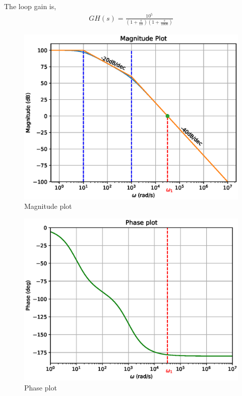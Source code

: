 \begin{enumerate}[label=\arabic*.,ref=\theenumi]
The loop gain is, 
\begin{align}
    GH(s) = \frac{10^5}{(1+\frac{s}{10})(1 + \frac{s}{1000})}
\end{align}

\begin{figure}[!ht]
    \centering
    \includegraphics[width=\columnwidth]{./figs/ee18btech11028/fig_1.eps}
    \caption{Magnitude plot}
    \label{fig:ee18btech11028_2_1}
\end{figure}


\begin{figure}[!ht]
    \centering
    \includegraphics[width=\columnwidth]{./figs/ee18btech11028/fig_2.eps}
    \caption{Phase plot}
    \label{fig:ee18btech11028_2_2}
\end{figure}



\end{enumerate}

